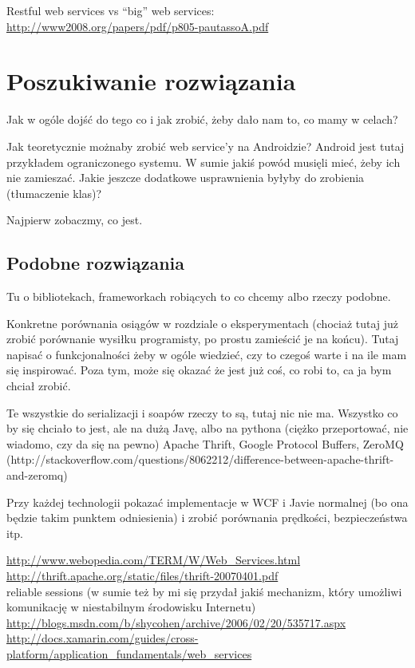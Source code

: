\documentclass[twoside,a4paper]{book}
\begin{document}
Restful web services vs ``big'' web services: \url{http://www2008.org/papers/pdf/p805-pautassoA.pdf}\\

\chapter{Poszukiwanie rozwiązania}
Jak w ogóle dojść do tego  co i jak zrobić, żeby dało nam to, co mamy w celach?

Jak teoretycznie możnaby zrobić web service'y na Androidzie? Android jest tutaj przykładem ograniczonego systemu.
W sumie jakiś powód musięli mieć, żeby ich nie zamieszać. Jakie jeszcze dodatkowe usprawnienia byłyby do zrobienia (tłumaczenie klas)?

Najpierw zobaczmy, co jest.

\section{Podobne rozwiązania}
Tu o bibliotekach, frameworkach robiących to co chcemy albo rzeczy podobne.

Konkretne porównania osiągów w rozdziale o eksperymentach (chociaż tutaj już zrobić porównanie wysiłku programisty, po prostu zamieścić je na końcu). Tutaj napisać o funkcjonalności żeby w ogóle wiedzieć, czy to czegoś warte i na ile mam się inspirować. Poza tym, może się okazać że jest już coś, co robi to, ca ja bym chciał zrobić.

Te wszystkie do serializacji i soapów rzeczy to są, tutaj nic nie ma. Wszystko co by się chciało to jest, ale na dużą Javę, albo na pythona (ciężko przeportować, nie wiadomo, czy da się na pewno) Apache Thrift, Google Protocol Buffers, ZeroMQ (http://stackoverflow.com/questions/8062212/difference-between-apache-thrift-and-zeromq)

Przy każdej technologii pokazać implementacje w WCF i Javie normalnej (bo ona będzie takim punktem odniesienia) i zrobić porównania prędkości, bezpieczeństwa itp.

\url{http://www.webopedia.com/TERM/W/Web_Services.html}\\
\url{http://thrift.apache.org/static/files/thrift-20070401.pdf}\\
reliable sessions (w sumie też by mi się przydał jakiś mechanizm, który umożliwi komunikację w niestabilnym środowisku Internetu)\\
\url{http://blogs.msdn.com/b/shycohen/archive/2006/02/20/535717.aspx}\\
\url{http://docs.xamarin.com/guides/cross-platform/application_fundamentals/web_services}\\
\end{document}
